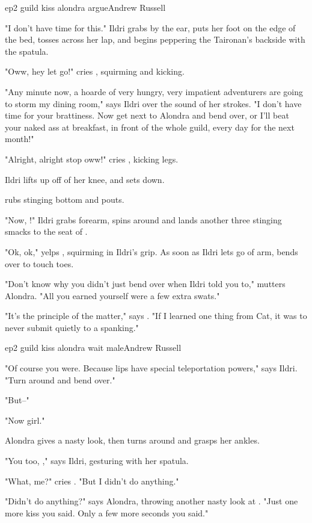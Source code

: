 \documentclass{book}
\begin{document}
\begin{childnode}{ep2 guild kiss alondra argue}{Andrew Russell}

    "I don't have time for this." Ildri grabs \name{} by the ear, puts her foot on the edge of the bed, tosses \name{} across her lap, and begins peppering the Taironan's backside with the
    spatula. 

    "Oww, hey let go!" cries \name{}, squirming and kicking.

    "Any minute now, a hoarde of very hungry, very impatient adventurers are going to storm my dining room," says Ildri over the sound of her strokes. "I don't have time for your brattiness. Now get next to Alondra and bend over, or I'll beat your naked ass
    at breakfast, in front of the whole guild, every day for the next month!"

    "Alright, alright stop oww!" cries \name{}, kicking \hisher{} legs.

    Ildri lifts \name{} up off of her knee, and sets \himher{} down.

    \name{} rubs \hisher{} stinging bottom and pouts.

    "Now, \boygirl{}!" Ildri grabs \names{} forearm, spins \himher{} around and lands another three stinging smacks to the seat of \names{} \pajamabottoms{}.

    "Ok, ok," yelps \name{}, squirming in Ildri's grip. As soon as Ildri lets go of \hisher{} arm, \name{} bends over to touch \hisher{} toes.

    "Don't know why you didn't just bend over when Ildri told you to," mutters Alondra. "All you earned yourself were a few extra swats."

    "It's the principle of the matter," says \name{}. "If I learned one thing from Cat, it was to never submit quietly to a spanking."


\end{childnode}

\begin{childnode}{ep2 guild kiss alondra wait male}{Andrew Russell}

    "Of course you were. Because \names{} lips have special teleportation powers," says Ildri. "Turn around and bend over."

    "But--"

    "Now girl."

    Alondra gives \name{} a nasty look, then turns around and grasps her ankles.

    "You too, \name{}," says Ildri, gesturing with her spatula.

    "What, me?" cries \name{}. "But I didn't do anything."

    "Didn't do anything?" says Alondra, throwing another nasty look at \name{}. "Just one more kiss you said. Only a few more seconds you said."



\end{childnode}
\end{document}
